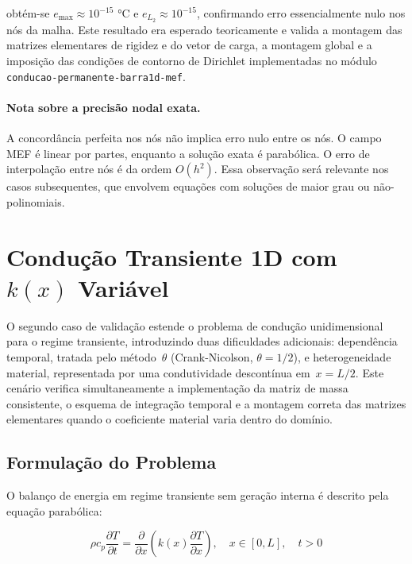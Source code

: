 \noindent obtém-se $e_{\max} \approx 10^{-15}$ °C e $e_{L_2} \approx 10^{-15}$, confirmando erro essencialmente nulo nos nós da malha. Este resultado era esperado teoricamente e valida a montagem das matrizes elementares de rigidez e do vetor de carga, a montagem global e a imposição das condições de contorno de Dirichlet implementadas no módulo \texttt{conducao-permanente-barra1d-mef}.

\paragraph{Nota sobre a precisão nodal exata.} A concordância perfeita nos nós não implica erro nulo entre os nós. O campo MEF é linear por partes, enquanto a solução exata é parabólica. O erro de interpolação entre nós é da ordem $O(h^2)$. Essa observação será relevante nos casos subsequentes, que envolvem equações com soluções de maior grau ou não-polinomiais.


\section{Condução Transiente 1D com $k(x)$ Variável}
\label{sec:val_calor_transiente}

O segundo caso de validação estende o problema de condução unidimensional para o regime transiente, introduzindo duas dificuldades adicionais: dependência temporal, tratada pelo método~$\theta$ (Crank-Nicolson, $\theta = 1/2$), e heterogeneidade material, representada por uma condutividade descontínua em~$x = L/2$. Este cenário verifica simultaneamente a implementação da matriz de massa consistente, o esquema de integração temporal e a montagem correta das matrizes elementares quando o coeficiente material varia dentro do domínio.

\subsection{Formulação do Problema}

O balanço de energia em regime transiente sem geração interna é descrito pela equação parabólica:

\begin{equation}
    \rho c_p \frac{\partial T}{\partial t} = \frac{\partial}{\partial x}\!\left( k(x) \frac{\partial T}{\partial x} \right), \quad x \in [0, L], \quad t > 0
    \label{eq:val_calor_transiente_edp}
\end{equation}

